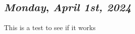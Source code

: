 \begin{center}
\section*{\month}
\end{center}

\def\day{\textit{April 1st, 2024}}
\def\weekday{\textit{Monday}}
\subsection*{\weekday, \day}

This is a test to see if it works